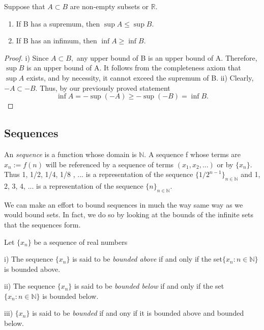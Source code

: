 \begin{theorem}
Suppose that $A \subset B$ are non-empty subsets or $\mathbb{R}.$
\begin{enumerate}
\item If B has a supremum, then $\sup A \leq \sup B.$
\item If B has an infimum, then $\inf A \geq \inf B.$
\end{enumerate}
\end{theorem}

\begin{proof}
i) Since $A \subset B,$ any upper bound of B is an upper bound of A. Therefore, $\sup B$ is an upper bound of A. It follows from the completeness axiom that $\sup A$ exists, and by necessity, it cannot exceed the supremum of B.\newline
ii) Clearly, $-A \subset -B.$ Thus, by our previously proved statement $$\inf A = -\sup (-A) \geq -\sup (-B) = \inf B.$$
\end{proof}

\subsection{Sequences}

An \emph{sequence} is a function whose domain is $\mathbb{N}.$ A sequence f whose terms are $x_n := f(n)$ will be referenced by a sequence of terms $(x_1, x_2, ...)$ or by $\{x_n\}.$ Thus 1, 1/2, 1/4, 1/8 , ... is a representation of the sequence $\{1/2^{n-1}\}_{n \in \mathbb{N}}$ and 1, 2, 3, 4, ... is a representation of the sequence $\{n\}_{n \in \mathbb{N}}.$ \newline

We can make an effort to bound sequences in much the way same way as we would bound sets. In fact, we do so by looking at the bounds of the infinite sets that the sequences form.

\begin{definition}
Let $\{x_n\}$ be a sequence of real numbers \newline

i)	 The sequence $\{x_n\}$ is said to be \emph{bounded above} if and only if the set$\{x_n: n \in \mathbb{N}\}$ is bounded above. \newline

ii)	 The sequence $\{x_n\}$ is said to be \emph{bounded below} if and only if the set $\{x_n: n \in \mathbb{N}\}$ is bounded below. \newline

iii) $\{x_n\}$ is said to be \emph{bounded} if and ony if it is bounded above and bounded below.
\end{definition}

